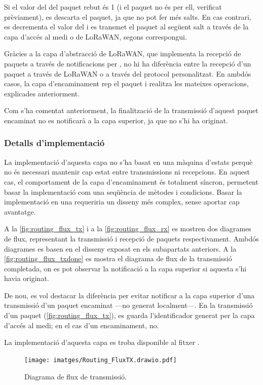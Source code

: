 \documentclass{tfgitic}[2024/07/01]
\begin{document}
{Si el valor del  del paquet rebut és 1 (i el paquet no és per ell, verificat prèviament), es descarta el paquet, ja que no pot fer més salts. En cas contrari, es decrementa el valor del  i es transmet el paquet al següent salt a través de la capa d'accés al medi o de LoRaWAN, segons correspongui.

Gràcies a la capa d'abstracció de LoRaWAN, que implementa la recepció de paquets a través de notificacions per , no hi ha diferència entre la recepció d'un paquet a través de LoRaWAN o a través del protocol personalitzat. En ambdós casos, la capa d'encaminament rep el paquet i realitza les mateixes operacions, explicades anteriorment.

Com s'ha comentat anteriorment, la finalització de la transmissió d'aquest paquet encaminat no es notificarà a la capa superior, ja que no s'hi ha originat.
\subsubsection{Detalls d'implementació}
La implementació d'aquesta capa no s'ha basat en una màquina d'estats perquè no és necessari mantenir cap estat entre transmissions ni recepcions. En aquest cas, el comportament de la capa d'encaminament és totalment síncron, permetent basar la implementació com una seqüència de mètodes i condicions. Basar la implementació en una  requeriria un disseny més complex, sense aportar cap avantatge. 
 
A la \autoref{fig:routing_flux_tx} i a la \autoref{fig:routing_flux_rx} es mostren dos diagrames de flux, representant la transmissió i recepció de paquets respectivament. Ambdós diagrames es basen en el disseny exposat en els subapartats anteriors. A la \autoref{fig:routing_flux_txdone} es mostra el diagrama de flux de la transmissió completada, on es pot observar la notificació a la capa superior si aquesta s'hi havia originat. 

De nou, es vol destacar la diferència per evitar notificar a la capa superior d'una transmissió d'un paquet encaminat ---no generat localment---. En la transmissió d'un paquet (\autoref{fig:routing_flux_tx}), es guarda l'identificador generat per la capa d'accés al medi; en el cas d'un encaminament, no.

La implementació d'aquesta capa es troba disponible al fitxer .

\begin{figure}
    \centering
        \texttt{[image: imatges/Routing\_FluxTX.drawio.pdf]}
    \caption{Diagrama de flux de transmissió.}
    \label{fig:routing_flux_tx}
\end{figure}

}
\end{document}
